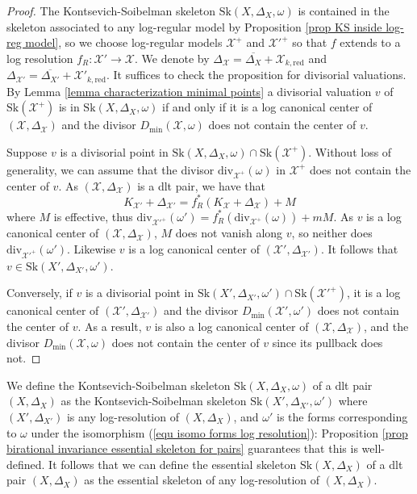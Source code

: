 \documentclass{amsart}%
\numberwithin{equation}{subsection}
\theoremstyle{plain2}
\theoremstyle{definition2}
\theoremstyle{stepstyle}
\theoremstyle{point}
\theoremstyle{subpoint}
\newcommand{\cX}{\ensuremath{\mathscr{X}}}
\newcommand{\redu}{\mathrm{red}}
\newcommand{\divisor}{\mathrm{div}}
\newcommand{\Sk}{\mathrm{Sk}}
\begin{document}
\begin{proof}
The Kontsevich-Soibelman skeleton $\Sk(X,\Delta_X,\omega)$ is contained in the skeleton associated to any log-regular model by Proposition \ref{prop KS inside log-reg model}, so we choose log-regular models $\cX^+$ and $\cX'^+$ so that $f$ extends to a log resolution $f_R \colon \cX' \to \cX$. We denote by $\Delta_\cX = \overline{\Delta_X} + \cX_{k,\redu}$ and $\Delta_{\cX'}=\overline{\Delta_{X'}} + \cX'_{k,\redu}$. It suffices to check the proposition for divisorial valuations. By Lemma \ref{lemma characterization minimal points} a divisorial valuation $v$ of $\Sk(\cX^+)$ is in $\Sk(X,\Delta_X,\omega)$ if and only if it is a log canonical center of $(\cX,\Delta_{\cX})$ and the divisor $D_{\min}(\cX,\omega)$ does not contain the center of $v$.  

Suppose $v$ is a divisorial point in $\Sk(X, \Delta_X,\omega) \cap \Sk(\cX^+)$. Without loss of generality, we can assume that the divisor $\divisor_{\cX^+}(\omega)$ in $\cX^+$ does not contain the center of $v$. As $(\cX, \Delta_\cX)$ is a dlt pair, we have that $$K_{\cX'}+\Delta_{\cX'}= f_R^*(K_{\cX}+\Delta_\cX)+M$$ where $M$ is effective, thus  $\divisor_{\cX'^+}(\omega')=f^*_R(\divisor_{\cX^+}(\omega))+mM$. As $v$ is a log canonical center of $(\cX,\Delta_\cX)$, $M$ does not vanish along $v$, so neither does $\divisor_{\cX'^+}(\omega')$. Likewise $v$ is a log canonical center of $(\cX', \Delta_{\cX'})$. It follows that $v \in \Sk(X',\Delta_{X'},\omega')$.

Conversely, if $v$ is a divisorial point in $\Sk(X', \Delta_{X'},\omega') \cap \Sk(\cX'^+)$, it is a log canonical center of $(\cX', \Delta_{\cX'})$ and the divisor $D_{\min}(\cX',\omega')$ does not contain the center of $v$. As a result, $v$ is also a log canonical center of $(\cX, \Delta_\cX)$, and the divisor $D_{\min}(\cX,\omega)$ does not contain the center of $v$ since its pullback does not.
\end{proof}
We define the Kontsevich-Soibelman skeleton $\Sk(X,\Delta_X,\omega)$ of a dlt pair $(X, \Delta_X)$ as the Kontsevich-Soibelman skeleton $\Sk(X',\Delta_{X'},\omega')$ where $(X',\Delta_{X'})$ is any log-resolution of $(X,\Delta_X)$, and $\omega'$ is the forms corresponding to $\omega$ under the isomorphism (\ref{equ isomo forms log resolution}): Proposition \ref{prop birational invariance essential skeleton for pairs} guarantees that this is well-defined. It follows that we can define the essential skeleton $\Sk(X,\Delta_X)$ of a dlt pair $(X, \Delta_X)$ as the essential skeleton of any log-resolution of $(X,\Delta_X)$.
\end{document}
